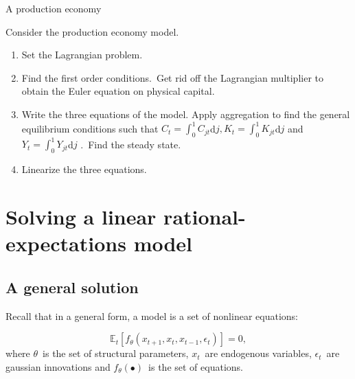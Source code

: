 \documentclass[a4paper,12pt]{article}%
\begin{document}
\begin{myexercise}{A production economy}
%


Consider the production economy model.

\begin{enumerate}
\item Set the Lagrangian problem.

\item Find the first order conditions.\ Get rid off the Lagrangian multiplier
to obtain the Euler equation on physical capital.

\item Write the three equations of the model. Apply aggregation to find the
general equilibrium conditions such that $C_{t}=%
{\textstyle\int\nolimits_{0}^{1}}
C_{jt}$d$j,K_{t}=%
{\textstyle\int\nolimits_{0}^{1}}
K_{jt}$d$j$ and $Y_{t}=%
{\textstyle\int\nolimits_{0}^{1}}
Y_{jt}$d$j$ .\ Find the steady state.

\item Linearize the three equations.
\end{enumerate}

%

\end{myexercise}%


\section{Solving a linear rational-expectations model}

\subsection{A general solution}

Recall that in a general form, a model is a set of nonlinear equations:%

\begin{equation}
\mathbb{E}_{t}\left[  f_{\theta}\left(  x_{t+1},x_{t},x_{t-1},\epsilon
_{t}\right)  \right]  =0, \label{eq non linear system}%
\end{equation}
where $\theta$\ is the set of structural parameters, $x_{t}$\ are endogenous
variables, $\epsilon_{t}$\ are gaussian innovations and $f_{\theta}(\bullet
)$\ is the set of equations.
\end{document}
